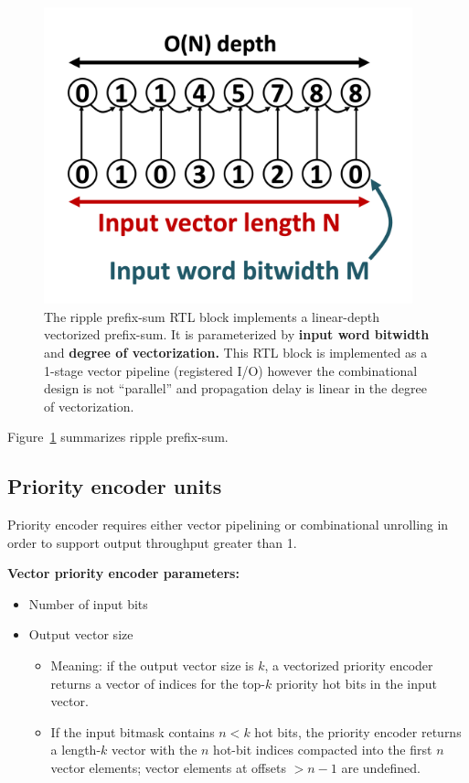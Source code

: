 \begin{figure}[H]
    \centering
    \includegraphics[width=0.95\textwidth]{figures/ripple_prefix_sum.png}
    \caption{The ripple prefix-sum RTL block implements a linear-depth vectorized prefix-sum. It is parameterized by \textbf{input word bitwidth} and \textbf{degree of vectorization.} This RTL block is implemented as a 1-stage vector pipeline (registered I/O) however the combinational design is not ``parallel'' and propagation delay is linear in the degree of vectorization.}
    \label{fig:ripple_prefix_sum}
\end{figure}

Figure~\ref{fig:ripple_prefix_sum} summarizes ripple prefix-sum.

\subsection{Priority encoder units}

Priority encoder requires either vector pipelining or combinational unrolling in order to support output throughput greater than 1.

\textbf{Vector priority encoder parameters:}

\begin{itemize}
    \item Number of input bits
    \item Output vector size
    
    \begin{itemize}
        \item Meaning: if the output vector size is $k$, a vectorized priority encoder returns a vector of indices for the top-$k$ priority hot bits in the input vector. 
        \item If the input bitmask contains $n < k$ hot bits, the priority encoder returns a length-$k$ vector with the $n$ hot-bit indices compacted into the first $n$ vector elements; vector elements at offsets $>n-1$ are undefined.
    \end{itemize}

\end{itemize}

